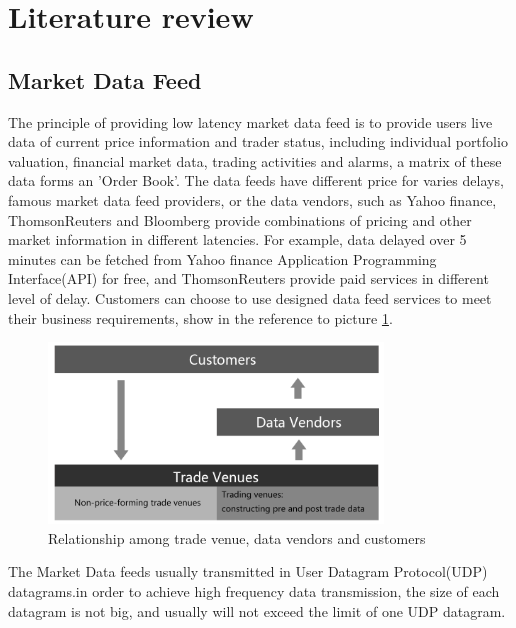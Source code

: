 \documentclass[11pt,openright,a4paper]{report}
\begin{document}
\section{Literature review}
\subsection{Market Data Feed}
The principle of providing low latency market data feed is to provide users live data of current price information and trader status, including individual portfolio valuation, financial market data, trading activities and alarms, a matrix of these data forms an 'Order Book'\cite{menkveld2013high}. The data feeds have different price for varies delays, famous market data feed providers, or the data vendors, such as Yahoo finance, ThomsonReuters and Bloomberg provide combinations of pricing and other market information in different latencies\cite{hasbrouck2013low}. For example, data delayed over 5 minutes can be fetched from Yahoo finance Application Programming Interface(API) for free\cite{financeyahoo}, and ThomsonReuters provide paid services in different level of delay. Customers can choose to use designed data feed services to meet their business requirements, show in the reference to picture \ref{fig:1}.\\
\begin{figure}[H] 
\centering\includegraphics[width=3.5in]{picture/tradevenue.PNG} 
\caption{Relationship among trade venue, data vendors and customers}
\label{fig:1} 
\end{figure} 
The Market Data feeds usually transmitted in User Datagram Protocol(UDP) datagrams\cite{brook2015low}.in order to achieve high frequency data transmission, the size of each datagram is not big, and usually will not exceed the limit of one UDP datagram. \\
\end{document}
